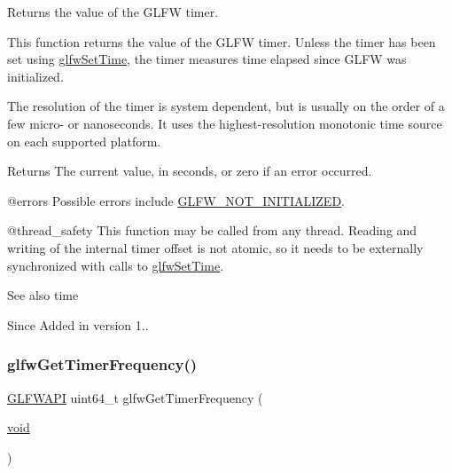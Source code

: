 Returns the value of the G\+L\+FW timer. 

This function returns the value of the G\+L\+FW timer. Unless the timer has been set using \mbox{\hyperlink{group__input_ga94360a3628a09f32708f83cc3fa48590}{glfw\+Set\+Time}}, the timer measures time elapsed since G\+L\+FW was initialized.

The resolution of the timer is system dependent, but is usually on the order of a few micro-\/ or nanoseconds. It uses the highest-\/resolution monotonic time source on each supported platform.

\begin{DoxyReturn}{Returns}
The current value, in seconds, or zero if an error occurred.
\end{DoxyReturn}
@errors Possible errors include \mbox{\hyperlink{group__errors_ga2374ee02c177f12e1fa76ff3ed15e14a}{G\+L\+F\+W\+\_\+\+N\+O\+T\+\_\+\+I\+N\+I\+T\+I\+A\+L\+I\+Z\+ED}}.

@thread\+\_\+safety This function may be called from any thread. Reading and writing of the internal timer offset is not atomic, so it needs to be externally synchronized with calls to \mbox{\hyperlink{group__input_ga94360a3628a09f32708f83cc3fa48590}{glfw\+Set\+Time}}.

\begin{DoxySeeAlso}{See also}
time
\end{DoxySeeAlso}
\begin{DoxySince}{Since}
Added in version 1.. 
\end{DoxySince}
\mbox{\label{group__input_gaa92d10b10013372778efbf6367714371}} 
\subsubsection{\texorpdfstring{glfwGetTimerFrequency()}{glfwGetTimerFrequency()}}
{\footnotesize\ttfamily \mbox{\hyperlink{glfw3_8h_a56da5036b2cc259351ae22fd6439bb47}{G\+L\+F\+W\+A\+PI}} uint64\+\_\+t glfw\+Get\+Timer\+Frequency (\begin{DoxyParamCaption}\item[{\mbox{\hyperlink{glad_8h_a950fc91edb4504f62f1c577bf4727c29}{void}}}]{ }\end{DoxyParamCaption})}



